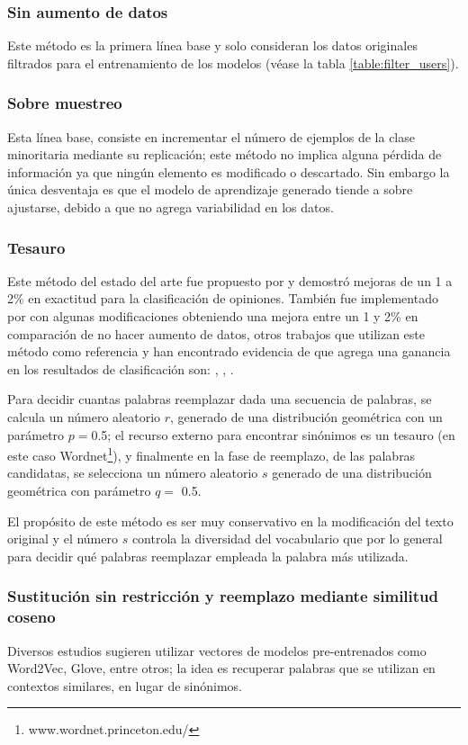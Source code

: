 \subsubsection{Sin aumento de datos}
Este método es la primera línea base y solo consideran los datos originales filtrados para el entrenamiento de los modelos (véase la tabla \ref{table:filter_users}).

\subsubsection{Sobre muestreo}
Esta línea base, consiste en incrementar el número de ejemplos de la clase minoritaria mediante su replicación; este método no implica alguna pérdida de información ya que ningún elemento es modificado o descartado. Sin embargo la única desventaja es que el modelo de aprendizaje generado tiende a sobre ajustarse, debido a que no agrega variabilidad en los datos.

\subsubsection{Tesauro}
Este método del estado del arte fue propuesto por \citep{zhang2015character} y demostró mejoras de un 1 a 2\% en exactitud para la clasificación de opiniones. También fue implementado por \citep{wei2019eda} con algunas modificaciones obteniendo una mejora entre un 1 y 2\% en comparación de no hacer aumento de datos, otros trabajos que utilizan este método como referencia y han encontrado evidencia de que agrega una ganancia en los resultados de clasificación son: \citep{jungiewicz2019towards}, \citep{kumar2019submodular}, \citep{park2019self}.

Para decidir cuantas palabras reemplazar dada una secuencia de palabras, se calcula un número aleatorio $r$, generado de una distribución geométrica con un parámetro $p=$0.5; el recurso externo para encontrar sinónimos es un tesauro (en este caso Wordnet\footnote{www.wordnet.princeton.edu/}), y finalmente en la fase de reemplazo, de las palabras candidatas, se selecciona un número aleatorio $s$ generado de una distribución geométrica con parámetro $q=$ 0.5.

El propósito de este método es ser muy conservativo en la modificación del texto original y el número $s$ controla la diversidad del vocabulario que por lo general para decidir qué palabras reemplazar empleada la palabra más utilizada.

\subsubsection{Sustitución sin restricción y reemplazo mediante similitud coseno}
Diversos estudios sugieren utilizar vectores de modelos pre-entrenados como Word2Vec, Glove, entre otros; la idea es recuperar palabras que se utilizan en contextos similares, en lugar de sinónimos. 

